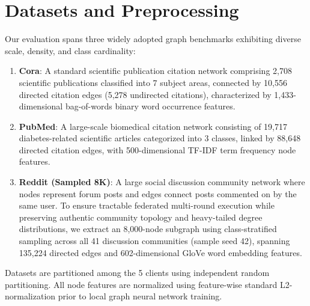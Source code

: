\section{Datasets and Preprocessing}
\label{sec:datasets_and_preprocessing}
Our evaluation spans three widely adopted graph benchmarks exhibiting diverse scale, density, and class cardinality:
\begin{enumerate}
    \item \textbf{Cora}: A standard scientific publication citation network comprising 2,708 scientific publications classified into 7 subject areas, connected by 10,556 directed citation edges (5,278 undirected citations), characterized by 1,433-dimensional bag-of-words binary word occurrence features.
    \item \textbf{PubMed}: A large-scale biomedical citation network consisting of 19,717 diabetes-related scientific articles categorized into 3 classes, linked by 88,648 directed citation edges, with 500-dimensional TF-IDF term frequency node features.
    \item \textbf{Reddit (Sampled 8K)}: A large social discussion community network where nodes represent forum posts and edges connect posts commented on by the same user. To ensure tractable federated multi-round execution while preserving authentic community topology and heavy-tailed degree distributions, we extract an 8,000-node subgraph using class-stratified sampling across all 41 discussion communities (sample seed 42), spanning 135,224 directed edges and 602-dimensional GloVe word embedding features.
\end{enumerate}
Datasets are partitioned among the 5 clients using independent random partitioning.
All node features are normalized using feature-wise standard L2-normalization prior to local graph neural network training.
